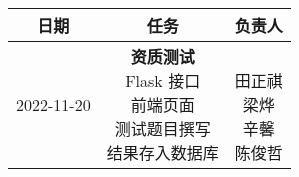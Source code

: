 \begin{table}[h!]
    \centering
    \begin{tabular}{ccc}\toprule
        \textbf{日期} & \textbf{任务} & \textbf{负责人} \\\midrule
        2022-11-20 & \makecell[l]{\textbf{资质测试} \\
            Flask 接口 \\
            前端页面 \\
            测试题目撰写 \\
            结果存入数据库 \\
        } & \makecell{ \\
            田正祺 \\
            梁烨 \\
            辛馨 \\
            陈俊哲 \\
        } \\
        \bottomrule
    \end{tabular}
\end{table}


\iffalse

2022-11-06 & \makecell[l]{\textbf{a} \\
a
} & \makecell{ \\
a
} \\\midrule

\fi